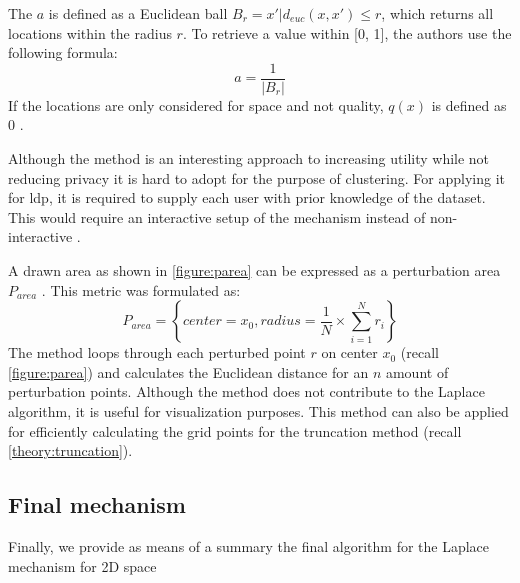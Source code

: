 The $a$ is defined as a Euclidean ball $B_r = {x' | d_{euc}(x, x') \leq r}$, which returns all locations within the radius $r$.
To retrieve a value within [0, 1], the authors use the following formula:
\begin{equation}
  a = \frac{1}{|B_r|}
  \label{equation:privacy-mass-a}
\end{equation}
If the locations are only considered for space and not quality, $q(x)$ is defined as 0 \citep{chatzikokolakis_constructing_2015}. \newline

Although the method is an interesting approach to increasing utility while not reducing privacy it is hard to adopt for the purpose of clustering.
For applying it for \gls{ldp}, it is required to supply each user with prior knowledge of the dataset.
This would require an interactive setup of the mechanism instead of non-interactive . \newline

A drawn area as shown in \ref{figure:parea} can be expressed as a perturbation area $P_{area}$ \citep{yan_perturb_2022}.
This metric was formulated as:
\begin{equation}
  P_{area}=\left\{ center = x_{0},radius = \frac{1}{N}\times \sum _{i=1}^{N}r_{i}\right\}
\end{equation}
The method loops through each perturbed point $r$ on center $x_0$ (recall \ref{figure:parea}) and calculates the Euclidean distance for an $n$ amount of perturbation points.
Although the method does not contribute to the Laplace algorithm, it is useful for visualization purposes.
This method can also be applied for efficiently calculating the grid points for the truncation method (recall \ref{theory:truncation}).
\newpage
\subsection{Final mechanism}
Finally, we provide as means of a summary the final algorithm for the Laplace mechanism for 2D space

\newpage
